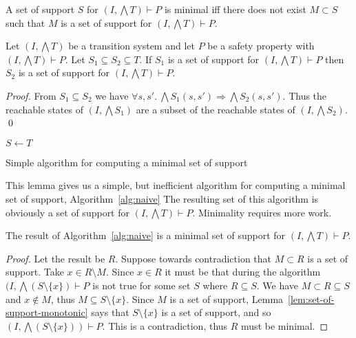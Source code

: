 \begin{definition}
  \label{def:minimal-set-of-support}
  A set of support $S$ for $(I, \bigwedge T)\vdash P$ is minimal iff
  there does not exist $M \subset S$ such that $M$ is a set of support
  for $(I, \bigwedge T)\vdash P$.
\end{definition}

\begin{lemma}
  \label{lem:set-of-support-monotonic}
  Let $(I, \bigwedge T)$ be a transition system and let $P$ be a
  safety property with $(I, \bigwedge T)\vdash P$. Let $S_1 \subseteq
  S_2 \subseteq T$. If $S_1$ is a set of support for $(I, \bigwedge
  T)\vdash P$ then $S_2$ is a set of support for $(I, \bigwedge T)\vdash P$.
\end{lemma}
\begin{proof}
  From $S_1 \subseteq S_2$ we have $\forall s, s'.~ \bigwedge
  S_1(s,s') \Rightarrow \bigwedge S_2(s, s')$. Thus the reachable
  states of $(I, \bigwedge S_1)$ are a subset of the reachable states
  of $(I, \bigwedge S_2)$. \qed
\end{proof}

\begin{algorithm}
\label{alg:naive}
  \BlankLine
  $S \leftarrow T$ \\
   {
  }
\caption{Simple algorithm for computing a minimal set of support}
\end{algorithm}

This lemma gives us a simple, but inefficient algorithm for computing
a minimal set of support, Algorithm~\ref{alg:naive}
 The resulting set
of this algorithm is obviously a set of support for $(I, \bigwedge
T)\vdash P$. Minimality requires more work.

\begin{lemma}
  The result of Algorithm~\ref{alg:naive} is a minimal set of support
  for $(I, \bigwedge T)\vdash P$.
\end{lemma}
\begin{proof}
  Let the result be $R$. Suppose towards contradiction that $M \subset
  R$ is a set of support. Take $x \in R\setminus M$. Since $x \in R$
  it must be that during the algorithm $(I,
  \bigwedge(S\setminus\{x\})\vdash P$ is not true for some set $S$
  where $R \subseteq S$. We have $M \subset R \subseteq S$ and
  $x\not\in M$, thus $M \subseteq S\setminus \{x\}$. Since $M$ is a
  set of support, Lemma~\ref{lem:set-of-support-monotonic} says that
  $S\setminus \{x\}$ is a set of support, and so $(I, \bigwedge
  (S\setminus\{x\}))\vdash P$. This is a contradiction, thus $R$ must
  be minimal.
\end{proof}

